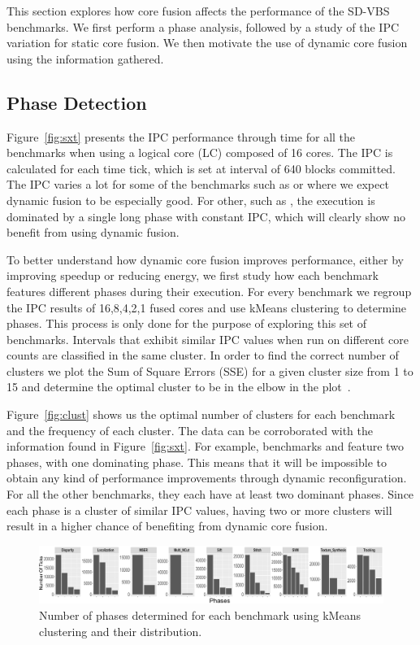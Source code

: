 
This section explores how core fusion affects the performance of the SD-VBS benchmarks.
We first perform a phase analysis, followed by a study of the IPC variation for static core fusion.
We then motivate the use of dynamic core fusion using the information gathered.

\subsection{Phase Detection}
Figure~\ref{fig:sxt} presents the IPC performance through time for all the benchmarks when using a logical core (LC) composed of 16 cores.
The IPC is calculated for each time tick, which is set at interval of 640 blocks committed.
The IPC varies a lot for some of the benchmarks such as  or  where we expect dynamic fusion to be especially good.
For other, such as , the execution is dominated by a single long phase with constant IPC, which will clearly show no benefit from using dynamic fusion.

To better understand how dynamic core fusion improves performance, either by improving speedup or reducing energy, we first study how each benchmark features different phases during their execution.
For every benchmark we regroup the IPC results of 16,8,4,2,1 fused cores and use kMeans clustering to determine phases.
This process is only done for the purpose of exploring this set of benchmarks.
Intervals that exhibit similar IPC values when run on different core counts are classified in the same cluster.
In order to find the correct number of clusters we plot the Sum of Square Errors (SSE) for a given cluster size from 1 to 15 and determine the optimal cluster to be in the elbow in the plot~\cite{everitCluster2001}.

\vspace{5mm}
Figure~\ref{fig:clust} shows us the optimal number of clusters for each benchmark and the frequency of each cluster.
The data can be corroborated with the information found in Figure~\ref{fig:sxt}.
For example, benchmarks  and  feature two phases, with one dominating phase.
This means that it will be impossible to obtain any kind of performance improvements through dynamic reconfiguration.
For all the other benchmarks, they each have at least two dominant phases.
Since each phase is a cluster of similar IPC values, having two or more clusters will result in a higher chance of benefiting from dynamic core fusion.


\begin{figure}[t]
    \centering
    \includegraphics[width=1\textwidth]{cases-paper/graphics/Exploration/clusters2.pdf}
        \vspace*{-7mm}
    \caption{Number of phases determined for each benchmark using kMeans clustering and their distribution.}
    \label{fig:clust}
\label{some example}
\end{figure}

